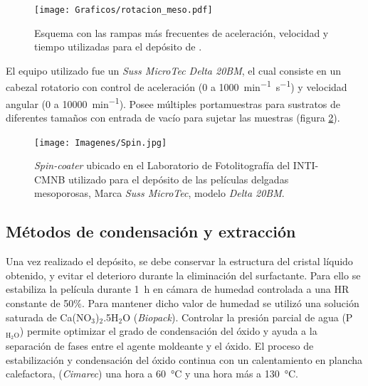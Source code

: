			   		   \begin{figure}[!ht]
						 \begin{center}
						 \texttt{[image: Graficos/rotacion\_meso.pdf]}
						 \caption[Parámetros de depósito para las \pdm]{Esquema con las rampas más frecuentes de aceleración, velocidad y tiempo utilizadas para el depósito de \pdm.}
						 \label{fig:rampa-spin}
						 \end{center}
						 \end{figure}
			
			 El equipo utilizado fue un \textit{Suss MicroTec Delta 20BM}, el cual consiste en un cabezal rotatorio con control de aceleración (0 a  \SI{1000}{\minute^{-1}.\second^{-1}}) y velocidad angular (0 a \SI{10000}{\minute^{-1}}). Posee múltiples portamuestras para sustratos de diferentes tamaños con entrada de vacío para sujetar las muestras (figura \ref{fig:spin}).   		   

					\begin{figure}[ht!]
					  \begin{center}
					  \texttt{[image: Imagenes/Spin.jpg]}
					  \caption[Equipo para el depósito de películas delgadas, \textit{spin-coater}]{\textit{Spin-coater} ubicado en el Laboratorio de Fotolitografía del INTI-CMNB utilizado para el depósito de las películas delgadas mesoporosas, Marca \textit{Suss MicroTec}, modelo \textit{Delta 20BM}.}
					  \label{fig:spin}
					  \end{center}
					  \end{figure}

	\subsection{Métodos de condensación y extracción}\label{sec:cond_y_extr}

		Una vez realizado el depósito, se debe conservar la estructura del cristal líquido obtenido, y evitar el deterioro durante la eliminación del surfactante. Para ello se estabiliza la película durante \SI{1}{\hour} en cámara de humedad controlada a una HR constante de 50\%. Para mantener dicho valor de humedad se utilizó una solución saturada de Ca(NO$_3$)$_2$.5H$_2$O (\textit{Biopack}). Controlar la presión parcial de agua (P$_{\text{H}_2\text{O}}$) permite optimizar el grado de condensación del óxido y ayuda a la separación de fases entre el agente moldeante y el óxido\cite{Crepaldi2003}. El proceso de estabilización y condensación del óxido continua con un calentamiento en plancha calefactora, (\textit{Cimarec}) una hora a \SI{60}{\celsius} y una hora más a \SI{130}{\celsius}\cite{Crepaldi2003,Crepaldi2002a}. 
				
